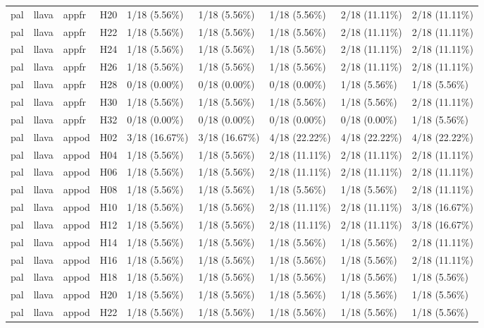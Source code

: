 \begin{longtable}{lllllllll}
pal & llava & appfr & H20 & 1/18 (5.56\%) & 1/18 (5.56\%) & 1/18 (5.56\%) & 2/18 (11.11\%) & 2/18 (11.11\%) \\
pal & llava & appfr & H22 & 1/18 (5.56\%) & 1/18 (5.56\%) & 1/18 (5.56\%) & 2/18 (11.11\%) & 2/18 (11.11\%) \\
pal & llava & appfr & H24 & 1/18 (5.56\%) & 1/18 (5.56\%) & 1/18 (5.56\%) & 2/18 (11.11\%) & 2/18 (11.11\%) \\
pal & llava & appfr & H26 & 1/18 (5.56\%) & 1/18 (5.56\%) & 1/18 (5.56\%) & 2/18 (11.11\%) & 2/18 (11.11\%) \\
pal & llava & appfr & H28 & 0/18 (0.00\%) & 0/18 (0.00\%) & 0/18 (0.00\%) & 1/18 (5.56\%) & 1/18 (5.56\%) \\
pal & llava & appfr & H30 & 1/18 (5.56\%) & 1/18 (5.56\%) & 1/18 (5.56\%) & 1/18 (5.56\%) & 2/18 (11.11\%) \\
pal & llava & appfr & H32 & 0/18 (0.00\%) & 0/18 (0.00\%) & 0/18 (0.00\%) & 0/18 (0.00\%) & 1/18 (5.56\%) \\
pal & llava & appod & H02 & 3/18 (16.67\%) & 3/18 (16.67\%) & 4/18 (22.22\%) & 4/18 (22.22\%) & 4/18 (22.22\%) \\
pal & llava & appod & H04 & 1/18 (5.56\%) & 1/18 (5.56\%) & 2/18 (11.11\%) & 2/18 (11.11\%) & 2/18 (11.11\%) \\
pal & llava & appod & H06 & 1/18 (5.56\%) & 1/18 (5.56\%) & 2/18 (11.11\%) & 2/18 (11.11\%) & 2/18 (11.11\%) \\
pal & llava & appod & H08 & 1/18 (5.56\%) & 1/18 (5.56\%) & 1/18 (5.56\%) & 1/18 (5.56\%) & 2/18 (11.11\%) \\
pal & llava & appod & H10 & 1/18 (5.56\%) & 1/18 (5.56\%) & 2/18 (11.11\%) & 2/18 (11.11\%) & 3/18 (16.67\%) \\
pal & llava & appod & H12 & 1/18 (5.56\%) & 1/18 (5.56\%) & 2/18 (11.11\%) & 2/18 (11.11\%) & 3/18 (16.67\%) \\
pal & llava & appod & H14 & 1/18 (5.56\%) & 1/18 (5.56\%) & 1/18 (5.56\%) & 1/18 (5.56\%) & 2/18 (11.11\%) \\
pal & llava & appod & H16 & 1/18 (5.56\%) & 1/18 (5.56\%) & 1/18 (5.56\%) & 1/18 (5.56\%) & 2/18 (11.11\%) \\
pal & llava & appod & H18 & 1/18 (5.56\%) & 1/18 (5.56\%) & 1/18 (5.56\%) & 1/18 (5.56\%) & 1/18 (5.56\%) \\
pal & llava & appod & H20 & 1/18 (5.56\%) & 1/18 (5.56\%) & 1/18 (5.56\%) & 1/18 (5.56\%) & 1/18 (5.56\%) \\
pal & llava & appod & H22 & 1/18 (5.56\%) & 1/18 (5.56\%) & 1/18 (5.56\%) & 1/18 (5.56\%) & 1/18 (5.56\%) \\

\end{longtable}
